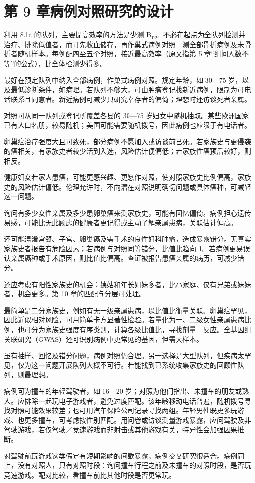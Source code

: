\section{第 9 章\quad 病例对照研究的设计}
\begin{answerlist}
\item[1.] 利用 8.1c 的队列，主要提高效率的方法是少测 B$_{12}$。不必在起点为全队列检测并治疗、排除低值者，而可先收血储存，再作巢式病例对照：测全部骨折病例及未骨折者随机样本。每例配四至五个对照，接近最高效率（原文指第 5 章“组间人数不等”的公式），比全体检测少得多。
\item[2a.] 最好在预定队列中纳入全部病例，作巢式病例对照。规定年龄，如 30—75 岁，以及最低诊断条件，如病理。若队列不够大，可由肿瘤登记找新近病例，限制为可电话联系且同意者。新近病例可减少只研究幸存者的偏倚；理想时还访谈死者亲属。
\item[2b.] 对照可从同一队列或登记所覆盖各县的 30—75 岁妇女中随机抽取。某些欧洲国家已有人口名册，较易随机；美国可能需要随机拨号，因此病例也应限于有电话者。
\item[2c.] 卵巢癌治疗强度大且可致死，部分病例不愿加入或访谈前已死。若家族史与更侵袭的癌相关，有家族史者较少活到入选，风险估计便偏低；若家族性癌预后较好，则相反。

健康妇女若家人患癌，可能更感兴趣、更愿作对照，使对照家族史比例偏高，家族史的风险估计偏低。伦理允许时，不向潜在对照说明确切问题或具体癌种，可减轻这一问题。
\item[2d.] 询问有多少女性亲属及多少患卵巢癌来测家族史，可能有回忆偏倚。病例担心遗传易感，可能比无此顾虑的健康者更记得或主动了解亲属患病，关联估计偏高。

还可能混淆宫颈、子宫、卵巢癌及需手术的良性妇科肿瘤，造成暴露错分。无真实家族史者报告有危险因素；若病例与对照同等错分，比值比趋向 1。若病例更易误认亲属癌种或手术原因，则比值比偏高。查证被报告患癌亲属的病历，可减少错分。

还应考虑有阳性家族史的机会：姨姑和年长姐妹多者，比小家庭、仅有兄弟或妹妹者，机会更多。第 10 章的匹配与分层可处理。
\item[2e.] 最简单是二分家族史，例如有无一级亲属患病，以比值比衡量关联。卵巢癌罕见，因此近似相对风险，可用简单卡方显著性检验。若量化为一、二级女性亲属患病比例，也可分为家族史强度有序类别，计算各级比值比，寻找剂量－反应。全基因组关联研究（GWAS）还可识别病例中更常见的基因，但需大样本。
\item[2f.] 虽有抽样、回忆及错分问题，病例对照仍合理。另一选择是大型队列，但疾病太罕见，仅为这一问题开展队列大概不可行。若能找到已系统收集家族史的回顾性队列，则最理想。
\item[3a.] 病例可为撞车的年轻驾驶者，如 16—20 岁；对照为他们指出、未撞车的朋友或熟人。应排除一起玩电子游戏者，避免过度匹配。该年龄移动电话普遍，随机拨号寻找对照可能效果较差；也可用汽车保险公司记录寻找两组。年轻男性既更多玩游戏、也更多撞车，可考虑按性别匹配。用问卷或访谈测量游戏暴露，应问驾驶及非驾驶游戏，若仅驾驶／竞速游戏而非射击或其他游戏有关，特异性会加强因果推断。
\item[3b.] 对驾驶前玩游戏这类假定有短期影响的间歇暴露，病例交叉研究很适合。病例同上，没有对照人，只有对照时段：询问撞车行程之前及未撞车的对照时段，是否玩竞速游戏。配对比较，看撞车前比其他时段是否更常玩。
\end{answerlist}

